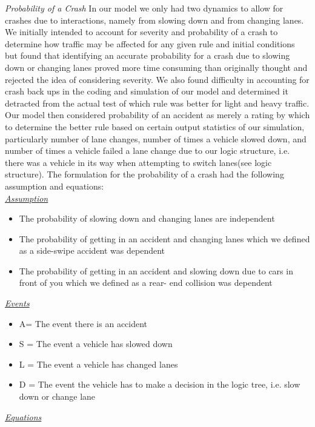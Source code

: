 \documentclass{amsart}
\begin{document}
		\textit{Probability of a Crash}
			In our model we only had two dynamics to allow for crashes due to interactions, namely from slowing down and from changing lanes. We initially intended to account for severity and probability of a crash to determine how traffic may be affected for any given rule and initial conditions but found that identifying an accurate probability for a crash due to slowing down or changing lanes proved more time consuming than originally thought and rejected the idea of considering severity. We also found difficulty in accounting for crash back ups in the coding and simulation of our model and determined it detracted from the actual test of which rule was better for light and heavy traffic. Our model then considered probability of an accident as merely a rating by which to determine the better rule based on certain output statistics of our simulation, particularly number of lane changes, number of times a vehicle slowed down, and number of times a vehicle failed a lane change due to our logic structure, i.e. there was a vehicle in its way when attempting to switch lanes(see logic structure). The formulation for the probability of  a crash had the following assumption and equations:\\
			\underline{\textit{Assumption}}
			\begin{itemize}
				\item The probability of slowing down and changing lanes are independent
				\item The probability of getting in an accident and changing lanes which we defined as a side-swipe accident was dependent
				\item The probability of getting in an accident and slowing down due to cars in front of you which we defined as a rear- end collision was dependent
			\end{itemize}
			\underline{\textit{Events}}
			\begin{itemize}
				\item A= The event there is an accident
				\item S = The event a vehicle has slowed down
				\item L = The event a vehicle has changed lanes
				\item D = The event the vehicle has to make a decision in the logic tree, i.e. slow down or change lane
			\end{itemize}
			\underline{\textit{Equations}}
\end{document}

